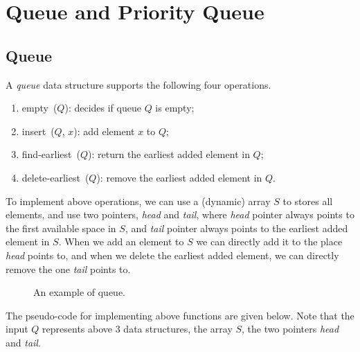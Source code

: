 \setcounter{definition}{0} \setcounter{property}{0} \setcounter{claim}{0} \setcounter{fact}{0} \setcounter{corollary}{0} \setcounter{figure}{0}

\section{Queue and Priority Queue}
\subsection*{Queue}

A \emph{queue} data structure supports the following four operations.
\begin{enumerate}
\item empty~($Q$): decides if queue $Q$ is empty;
\item insert~($Q$, $x$): add element $x$ to $Q$;
\item find-earliest~($Q$): return the earliest added element in $Q$;
\item delete-earliest~($Q$): remove the earliest added element in $Q$.
\end{enumerate}

To implement above operations, we can use a (dynamic) array $S$ to stores all elements,
and use two pointers, \emph{head} and \emph{tail}, where \emph{head} pointer always points
to the first available space in $S$, and \emph{tail} pointer always points to the 
earliest added element in $S$. When we add an element to $S$ we can directly
add it to the place \emph{head} points to, and when we delete the earliest added
element, we can directly remove the one \emph{tail} points to.

\begin{figure}[h!]
\centering{}
\caption{An example of queue.}
\end{figure}

The pseudo-code for implementing above functions are given below. Note
that the input $Q$ represents above 3 data structures, the array $S$, the two pointers \emph{head} and \emph{tail}. 

\begin{algorithmblock}[0.8\textwidth]
	\xxx
	\xxx
	\xxx
\end{algorithmblock}

\begin{algorithmblock}[0.8\textwidth]
	\xxx
	\xxx
	\xxx
\end{algorithmblock}

